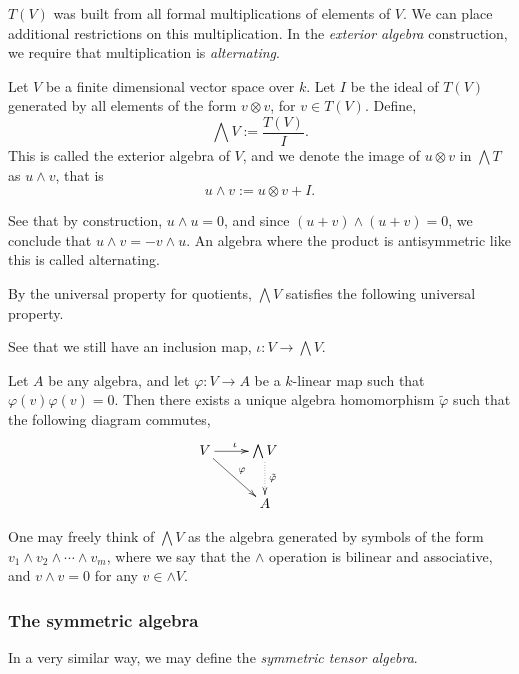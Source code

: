 $T(V)$ was built from all formal multiplications of elements of $V$. We 
can place additional restrictions on this multiplication. In the \emph{exterior algebra}
construction, we require that multiplication is \emph{alternating}.
\begin{definition}
    Let $V$ be a finite dimensional vector space over $k$. 
    Let $I$ be the ideal of $T(V)$ generated by all elements of the form
    $v \otimes v$, for $v \in T(V)$.
    Define,
    \begin{equation*}
        \bigwedge V := \frac{T(V)}{I}.
    \end{equation*}
    This is called the exterior algebra of $V$, and we denote
    the image of $u \otimes v$ in $\bigwedge T$ as $u \wedge v$, that is
    \begin{equation*}
        u \wedge v := u \otimes v + I.
    \end{equation*}

    See that by construction, $u \wedge u = 0$, and since $(u+v)\wedge(u+v) = 0$,
    we conclude that $u\wedge v = - v \wedge u$. An algebra where the product
    is antisymmetric like this is called alternating.
\end{definition}

By the universal property for quotients, $\bigwedge V$ satisfies the following
universal property.
\begin{proposition}
    See that we still have an inclusion map, $\iota:V\rightarrow \bigwedge V$.

    Let $A$ be any algebra, and let $\varphi:V\rightarrow A$
    be a $k$-linear map such that $\varphi(v)\varphi(v) = 0$. Then there exists
    a unique algebra homomorphism $\tilde{\varphi}$ such that the following diagram
    commutes,
    \begin{displaymath}
    \xymatrix{
        V \ar[r]^\iota \ar[rd]^\varphi&
        \bigwedge V \ar@{.>}[d]^{\tilde{\varphi}}&\\
        &
        A
    }
    \end{displaymath}
\end{proposition}

One may freely think of $\bigwedge V$ as the algebra
generated by symbols of the form $v_1 \wedge v_2 \wedge \cdots \wedge v_m$,
where we say that the $\wedge$ operation is bilinear and associative, and $v \wedge v = 0$
for any $v \in \wedge V$.

\subsubsection{The symmetric algebra}
In a very similar way, we may define the \emph{symmetric tensor algebra}.

